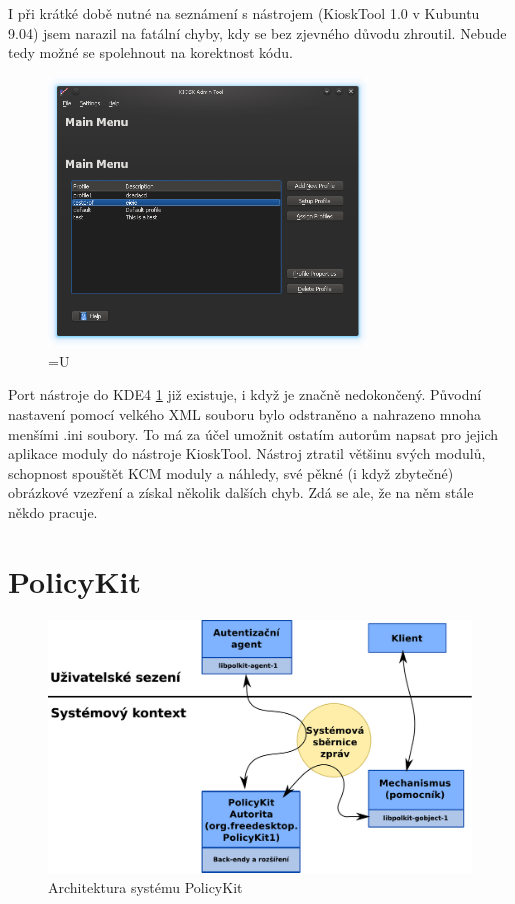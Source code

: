 I při krátké době nutné na seznámení s nástrojem (KioskTool 1.0 v Kubuntu 9.04)
jsem narazil na fatální chyby, kdy se bez zjevného důvodu zhroutil. Nebude tedy
možné se spolehnout na korektnost kódu.

\begin{figure}[h]
    \centering
    \includegraphics[width=8.5cm]{obrazky/KioskToolKDE4/kiosktool_kde4.png}
    \caption{=U}
    \label{fig:kt4_uvod}
\end{figure}

Port nástroje do KDE4 \ref{fig:kt4_uvod} již existuje, i když je značně
nedokončený.  %
Původní nastavení pomocí velkého XML souboru bylo odstraněno a nahrazeno mnoha
menšími .ini soubory. To má za účel umožnit ostatím autorům napsat pro jejich
aplikace moduly do nástroje KioskTool. Nástroj ztratil většinu svých modulů,
schopnost spouštět KCM moduly a náhledy, své pěkné (i když zbytečné) obrázkové
vzezření a získal několik dalších chyb. Zdá se ale, že na něm stále někdo
pracuje. %

\section{PolicyKit}
\begin{figure}[h]
    \centering
    \includegraphics[width=12cm]{obrazky/polkit-architecture-vector-cz.pdf}
    \caption{Architektura systému PolicyKit}
    \label{fig:polkit_arch}
\end{figure}

